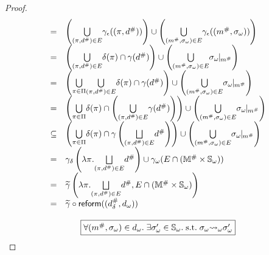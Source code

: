 \begin{proof}
\[\begin{array}{cl}
      =& \left( \underset{(\view, \abselem) \in E}{\bigcup} \aelemgamma((\view,
      \abselem)) \right) \cup \left( \underset{(\absimap, \symbst) \in
    E}{\bigcup} \aelemgamma((\absimap, \symbst)) \right)\\

      =& \left( \underset{(\view, \abselem) \in E}{\bigcup} \viewmap(\view) \cap
      \gamma(\abselem) \right) \cup \left( \underset{(\absimap, \symbst) \in
      E}{\bigcup} \instant{\symbst}{\absimap} \right)\\

      =& \left( \underset{\view \in \viewset}{\bigcup} { \underset{(\view,
      \abselem) \in E}{\bigcup} \viewmap(\view) \cap \gamma(\abselem) } \right)
      \cup \left( \underset{(\absimap, \symbst) \in E}{\bigcup}
      \instant{\symbst}{\absimap} \right)\\

      =& \left( \underset{\view \in \viewset}{\bigcup} {\viewmap(\view) \cap
        \left(\underset{(\view, \abselem) \in
      E}{\bigcup}{\gamma(\abselem)}\right)} \right) \cup \left(
      \underset{(\absimap, \symbst) \in E}{\bigcup} \instant{\symbst}{\absimap}
      \right)\\

      \subseteq& \left( \underset{\view \in \viewset}{\bigcup} {\viewmap(\view)
        \cap \gamma\left( \underset{(\view, \abselem) \in E}{\bigjoin}\abselem
      \right)} \right) \cup \left( \underset{(\absimap, \symbst) \in E}{\bigcup}
      \instant{\symbst}{\absimap} \right)\\

      =& \sgamma\left( \lambda \view. \underset{(\view, \abselem) \in
      E}{\bigjoin}\abselem \right) \cup \symbgamma(E \cap (\absimapset \times
      \symbstset))\\

      =& \combgamma\left( \lambda \view. \underset{(\view, \abselem) \in
      E}{\bigjoin}\abselem, E \cap (\absimapset \times \symbstset) \right)\\

      =& \combgamma \circ \reform((\sabselem, \symbelem))\\
    \end{array}
  \]
  \[\]
  \[
    \fbox{$\forall ({m}^{\#}, {\sigma}_\omega) \in {{d}_\omega}. \; \exists {\sigma}_\omega' \in
    {\mathbb{S}}_\omega.  \; \text{s.t.} \; {\sigma}_\omega {\leadsto}_\omega {\sigma}_\omega'$}
  \]


\end{proof}
